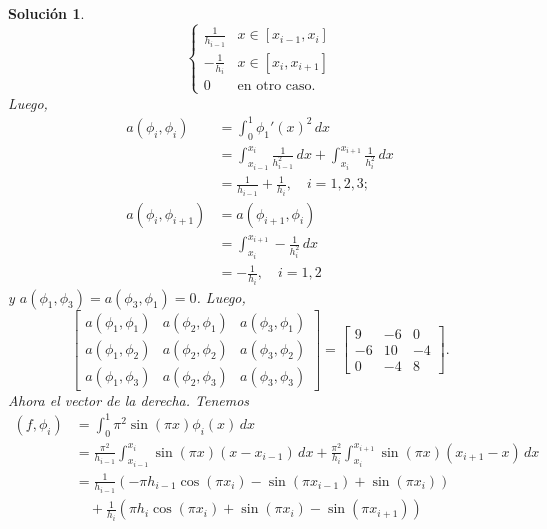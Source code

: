 \documentclass[11pt]{article}
\newtheorem*{sol}{Solución}
\newcommand\<{\langle}
\renewcommand\>{\rangle}
\begin{document}
\begin{sol}
\begin{equation}
\begin{cases}
      \frac{1}{h_{i-1}} & x\in[x_{i-1},x_i] \\
      -\frac{1}{h_i} & x\in[x_i,x_{i+1}] \\
      0 & \text{en otro caso}.
    \end{cases}
  \end{equation}
  Luego,
  \begin{align}
    a(\phi_i,\phi_i)
    &= \int_0^{1}\phi_1'(x)^{2}\,dx \\
    &= \int_{x_{i-1}}^{x_i}\frac{1}{h_{i-1}^{2}}\,dx
    + \int_{x_{i}}^{x_{i+1}}\frac{1}{h_{i}^{2}}\,dx \\
    &= \frac{1}{h_{i-1}} + \frac{1}{h_{i}}, \quad i=1,2,3;
    \\
    a(\phi_{i},\phi_{i+1})
    &= a(\phi_{i+1},\phi_i) \\
    &= \int_{x_{i}}^{x_{i+1}}-\frac{1}{h_i^{2}}\,dx \\
    &= -\frac{1}{h_i}, \quad i=1,2
  \end{align}
  y $a(\phi_1,\phi_3)=a(\phi_3,\phi_1)=0$.
  Luego,
  \begin{equation}
    \begin{bmatrix}
      a(\phi_1,\phi_1)
      &a(\phi_2,\phi_1)
      &a(\phi_3,\phi_1)
      \\
      a(\phi_1,\phi_2)
      &a(\phi_2,\phi_2)
      &a(\phi_3,\phi_2)
      \\
      a(\phi_1,\phi_3)
      &a(\phi_2,\phi_3)
      &a(\phi_3,\phi_3)
    \end{bmatrix}
    =
    \begin{bmatrix}
      9 &-6 &0 \\
      -6 &10 &-4 \\
      0 &-4 &8
    \end{bmatrix}
  .\end{equation}
  Ahora el vector de la derecha. Tenemos
  \begin{align}
    (f,\phi_i)
      &= \int_{0}^{1}\pi^{2}\sin(\pi x)\phi_i(x)\,dx
    \\
      &= \frac{\pi^{2}}{h_{i-1}}
      \int_{x_{i-1}}^{x_{i}}\sin(\pi x) (x-x_{i-1})\,dx
      +
      \frac{\pi^{2}}{h_i}
      \int_{x_{i}}^{x_{i+1}}\sin(\pi x)(x_{i+1}-x)\,dx
    \\
    &= 
      \frac{1}{h_{i-1}}
      (-\pi h_{i-1}\cos(\pi x_i) - \sin(\pi x_{i-1})+\sin(\pi x_i))
      \\
      &\quad
      +
      \frac{1}{h_{i}}
      (\pi h_i\cos(\pi x_{i})+\sin(\pi x_i) -\sin(\pi x_{i+1}))
      \\

\end{align}
\end{sol}
\end{document}
